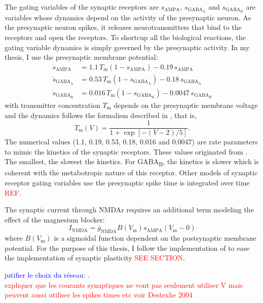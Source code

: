 The gating variables of the synaptic receptors are $s_\mathrm{AMPA}$, $s_{\mathrm{GABA}_\mathrm{A}}$ and $s_{\mathrm{GABA}_\mathrm{B}}$ are variables whose dynamics depend on the activity of the presynaptic neuron. As the presynaptic neuron spikes, it releases neurotransmitters that bind to the receptors and open the receptors. To shortcup all the biological reactions, the gating variable dynamics is simply governed by the presynaptic activity. In my thesis, I use the presynaptic membrane potential:
\begin{align*}
	\dot{s}_\mathrm{AMPA} & = 1.1 \, T_\mathrm{m} (1-s_\mathrm{AMPA}) - 0.19 \,s_\mathrm{AMPA} \\
	\dot{s}_{\mathrm{GABA}_\mathrm{A}} &= 0.53 \, T_\mathrm{m} (1- s_{\mathrm{GABA}_\mathrm{A}}) - 0.18 \,s_{\mathrm{GABA}_\mathrm{A}} \\
	\dot{s}_{\mathrm{GABA}_\mathrm{B}} &= 0.016 \, T_\mathrm{m} (1- s_{\mathrm{GABA}_\mathrm{B}}) - 0.0047\, s_{\mathrm{GABA}_\mathrm{B}}
\end{align*}
with transmitter concentration $T_\mathrm{m}$ depends on the presynaptic membrane voltage and the dynamics follows the formalism described in \cite{destexhe_synthesis_1994}, that is,
$$T_\mathrm{m}(V) = \dfrac{1}{1+\exp\left[-(V-2)/5\right]}.$$ 
The numerical values (1.1, 0.19, 0.53, 0.18, 0.016 and 0.0047) are rate parameters to mimic the kinetics of the synaptic receptors. These values originated from \cite{destexhe_synthesis_1994}. The smallest, the slowest the kinetics. For GABA\textsubscript{B}, the kinetics is slower which is coherent with the metabotropic nature of this receptor. Other models of synaptic receptor gating variables use the presynaptic spike time is integrated over time \textcolor{red}{REF}.

The synaptic current through \acrshort{NMDAr} requires an additional term modeling the effect of the magnesium blocker: 
$$ I_{\mathrm{NMDA}}	= \bar{g}_{\mathrm{NMDA}} B(V_\mathrm{m}) s_\mathrm{AMPA}(V_\mathrm{m} - 0) $$
where $B(V_\mathrm{m})$ is a sigmoidal function dependent on the postsynaptic membrane potential. For the purpose of this thesis, I follow the implementation of \citep{graupner_calcium-based_2012} to ease the implementation of synaptic plasticity \textcolor{red}{SEE SECTION}. 


\textcolor{blue}{jutifier le choix du réseau:} \citep{sherman_functional_1996}.\\

\textcolor{red}{expliquer que les courants synaptiques ne vont pas seulement utiliser V mais peuvent aussi utiliser les spikes times etc voir Destexhe 2004}


